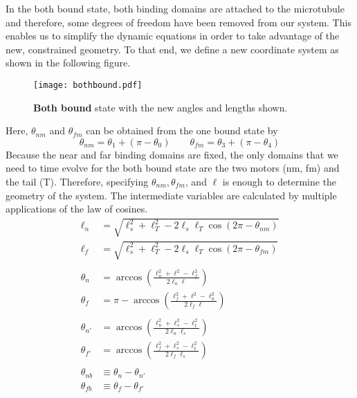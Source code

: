 		In the both bound state, both binding domains are attached to the microtubule and therefore, some degrees of freedom have been removed from our system. This enables us to simplify the dynamic equations in order to take advantage of the new, constrained geometry. To that end, we define a new coordinate system as shown in the following figure. 
		
		\begin{figure}[!hbt]
			\centering
			\texttt{[image: bothbound.pdf]}
			\caption[The both bound state]{\textbf{Both bound} state with the new angles and lengths shown.}
			\label{fig:bothbound}
		\end{figure}
		
		Here, $\theta_{nm}$ and $\theta_{fm}$ can be obtained from the one bound state by 
		\begin{equation}
			\theta_{nm} = \theta_1+(\pi-\theta_0) \qquad \theta_{fm}= \theta_3 + (\pi-\theta_4) 
		\end{equation}
		Because the near and far binding domains are fixed, the only domains that we need to time evolve for the both bound state are the two motors (nm, fm) and the tail (T). Therefore, specifying $\theta_{nm}, \theta_{fm}$, and $\ell$ is enough to determine the geometry of the system. The intermediate variables are calculated by multiple applications of the law of cosines. 
		\begin{align}
			\ell_n &= \sqrt{\ell_s^2+\ell_T^2-2\ell_s\ell_T\cos(2\pi-\theta_{nm})} \\
			\ell_f &=  \sqrt{\ell_s^2+\ell_T^2-2\ell_s\ell_T\cos(2\pi-\theta_{fm})} \\
			\text{}\nonumber\\
			 \theta_n &= \arccos\left(\frac{\ell_n^2+\ell^2-\ell_f^2}{2\ell_n\ell}\right)\\
			\theta_f &= \pi-\arccos\left(\frac{\ell_f^2+\ell^2-\ell_n^2}{2\ell_f\ell}\right)\\
			\text{}\nonumber\\
			\theta_{n'} &= \arccos\left(\frac{\ell_n^2+\ell_s^2-\ell_t^2}{2\ell_n\ell_s}\right) \\
			\theta_{f'} &= \arccos\left(\frac{\ell_f^2+\ell_s^2-\ell_t^2}{2\ell_f\ell_s}\right) \\ 
			\text{}\nonumber \\ 
			\theta_{nb} &\equiv \theta_{n}-\theta_{n'} \\ 
			\theta_{fb} &\equiv \theta_{f}-\theta_{f'} 
		\end{align}
